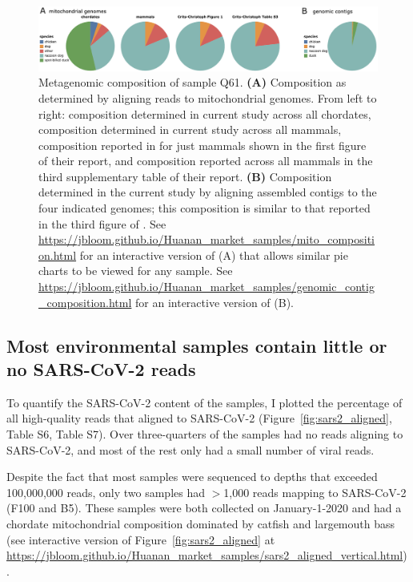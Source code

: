 \documentclass[9pt,twocolumn,twoside]{gsajnl_modified}
\begin{document}
\begin{figure}
\includegraphics[width=\linewidth]{fig1.pdf}
\caption{
Metagenomic composition of sample Q61.
{\bf (A)}
Composition as determined by aligning reads to mitochondrial genomes.
From left to right: composition determined in current study across all chordates, composition determined in current study across all mammals, composition reported in \citet{crits2023genetic} for just mammals shown in the first figure of their report, and composition reported \citet{crits2023genetic} across all mammals in the third supplementary table of their report.
{\bf (B)}
Composition determined in the current study by aligning assembled contigs to the four indicated genomes; this composition is similar to that reported in the third figure of \citet{crits2023genetic}.
See \url{https://jbloom.github.io/Huanan_market_samples/mito_composition.html} for an interactive version of (A) that allows similar pie charts to be viewed for any sample.
See \url{https://jbloom.github.io/Huanan_market_samples/genomic_contig_composition.html} for an interactive version of (B).
\label{fig:composition}
}
\end{figure}

\subsection{Most environmental samples contain little or no SARS-CoV-2 reads}
To quantify the SARS-CoV-2 content of the samples, I plotted the percentage of all high-quality reads that aligned to SARS-CoV-2 (Figure~\ref{fig:sars2_aligned}, Table S6, Table S7).
Over three-quarters of the samples had no reads aligning to SARS-CoV-2, and most of the rest only had a small number of viral reads.

Despite the fact that most samples were sequenced to depths that exceeded 100,000,000 reads, only two samples had $>$1,000 reads mapping to SARS-CoV-2 (F100 and B5).
These samples were both collected on January-1-2020 and had a chordate mitochondrial composition dominated by catfish and largemouth bass (see interactive version of Figure~\ref{fig:sars2_aligned} at \url{https://jbloom.github.io/Huanan_market_samples/sars2_aligned_vertical.html}).
\end{document}
